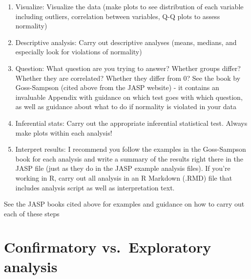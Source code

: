 \documentclass[
]{book}
\providecommand{\tightlist}{%
  \setlength{\itemsep}{0pt}\setlength{\parskip}{0pt}}
\begin{document}
\begin{enumerate}
\def\labelenumi{\arabic{enumi})}
\setcounter{enumi}{2}
\tightlist
\item
  Visualize: Visualize the data (make plots to see distribution of each variable including outliers, correlation between variables, Q-Q plots to assess normality)
\item
  Descriptive analysis: Carry out descriptive analyses (means, medians, and especially look for violations of normality)
\item
  Question: What question are you trying to answer? Whether groups differ? Whether they are correlated? Whether they differ from 0? See the book by Goss-Sampson (cited above from the JASP website) - it contains an invaluable Appendix with guidance on which test goes with which question, as well as guidance about what to do if normality is violated in your data
\item
  Inferential stats: Carry out the appropriate inferential statistical test. Always make plots within each analysis!
\item
  Interpret results: I recommend you follow the examples in the Goss-Sampson book for each analysis and write a summary of the results right there in the JASP file (just as they do in the JASP example analysis files). If you're working in R, carry out all analysis in an R Markdown (.RMD) file that includes analysis script as well as interpretation text.
\end{enumerate}

See the JASP books cited above for examples and guidance on how to carry out each of these steps

\hypertarget{confirmatory-vs.-exploratory-analysis}{%
\section{Confirmatory vs.~Exploratory analysis}\label{confirmatory-vs.-exploratory-analysis}}
\end{document}

